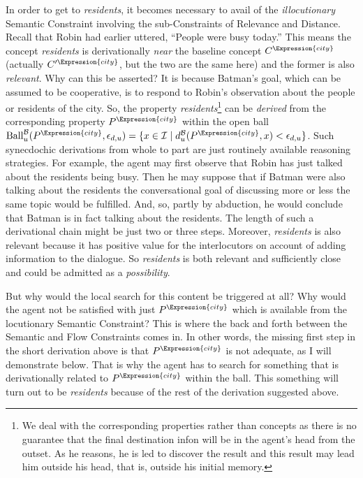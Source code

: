In order to get to \emph{residents}, it becomes necessary to avail of the \emph{illocutionary} Semantic Constraint involving the sub-Constraints of Relevance and Distance. Recall that Robin had earlier uttered, ``People were busy today.'' This means the concept \emph{residents} is derivationally \emph{near} the baseline concept $C^{\Expression{city}}$ (actually $C'^{\Expression{city}}$, but the two are the same here) and the former is also \emph{relevant}. Why can this be asserted? It is because Batman's goal, which can be assumed to be cooperative, is to respond to Robin's observation about the people or residents of the city. So, the property \emph{residents}\footnote{We deal with the corresponding properties rather than concepts as there is no guarantee that the final destination infon will be in the agent's head from the outset. As he reasons, he is led to discover the result and this result may lead him outside his head, that is, outside his initial memory.} can be \emph{derived} from the corresponding property $P^{\Expression{city}}$ within the open ball $\hbox{Ball}^{\cal B}_u(P^{\Expression{city}}, \epsilon_{d,u}) = \{ x \in {\cal I} \mid d^{\cal B}_u(P^{\Expression{city}}, x) < \epsilon_{d,u} \}$. Such synecdochic derivations from whole to part are just routinely available reasoning strategies. For example, the agent may first observe that Robin has just talked about the residents being busy. Then he may suppose that if Batman were also talking about the residents the conversational goal of discussing more or less the same topic would be fulfilled. And, so, partly by abduction, he would conclude that Batman is in fact talking about the residents. The length of such a derivational chain might be just two or three steps. Moreover, \emph{residents} is also relevant because it has positive value for the interlocutors on account of adding  information to the dialogue. So \emph{residents} is both relevant and sufficiently close and could be admitted as a \emph{possibility}. 

But why would the local search for this content be triggered at all? Why would the agent not be satisfied with just $P^\Expression{city}$ which is available from the locutionary Semantic Constraint? This is where the back and forth between the Semantic and Flow Constraints comes in. In other words, the missing first step in the short derivation above is that $P^\Expression{city}$ is not adequate, as I will demonstrate below. That is why the agent has to search for something that is derivationally related to $P^\Expression{city}$ within the ball. This something will turn out to be \emph{residents} because of the rest of the derivation suggested above. 

